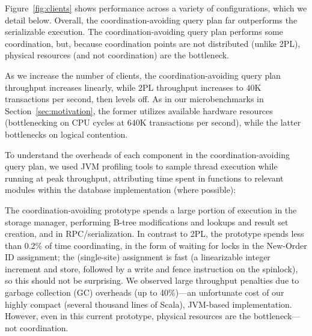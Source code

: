  Figure~\ref{fig:clients} shows performance
across a variety of configurations, which we detail below. Overall,
the coordination-avoiding query plan far outperforms the serializable
execution. The coordination-avoiding query plan performs some
coordination, but, because coordination points are not distributed
(unlike 2PL), physical resources (and not coordination) are the bottleneck.

 As we increase the number of clients, the
coordination-avoiding query plan throughput increases linearly, while
2PL throughput increases to $40$K transactions per second, then levels
off. As in our microbenchmarks in Section~\ref{sec:motivation}, the
former utilizes available hardware resources (bottlenecking
on CPU cycles at $640$K transactions per second), while the latter
bottlenecks on logical contention.

 To understand the overheads
of each component in the coordination-avoiding query plan, we used JVM
profiling tools to sample thread execution while running at peak
throughput, attributing time spent in functions to relevant modules
within the database implementation (where possible):

\vspace{-.5em}
\begin{center}
\centering
\small
\setlength{\fboxsep}{4pt}
\end{center}
\vspace{-.5em}

The coordination-avoiding prototype spends a large portion of
execution in the storage manager, performing B-tree modifications and
lookups and result set creation, and in RPC/serialization. In contrast
to 2PL, the prototype spends less than $0.2\%$ of time coordinating,
in the form of waiting for locks in the New-Order ID assignment; the
(single-site) assignment is fast (a linearizable integer increment and
store, followed by a write and fence instruction on the spinlock), so
this should not be surprising. We observed large throughput penalties
due to garbage collection (GC) overheads (up to 40\%)---an unfortunate
cost of our highly compact (several thousand lines of Scala),
JVM-based implementation. However, even in this current prototype,
physical resources are the bottleneck---not coordination.

